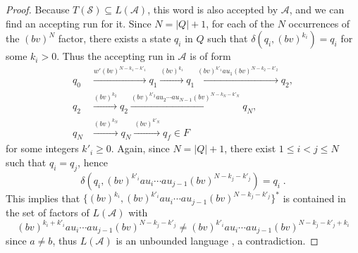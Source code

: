 \documentclass[11pt,reqno,a4paper]{amsart}
\newcommand{\ru}[1]{\xrightarrow{#1}}
\theoremstyle{plain}
\theoremstyle{definition}
\theoremstyle{remark}
\begin{document}
\begin{proof}
  Because $T(\mathcal{S})\subseteq L(\mathcal{A})$, this word is also
  accepted by $\mathcal{A}$, and we can find an accepting run for it.
  Since $N=|Q|+1$, for each of the $N$ occurrences of the $(bv)^N$
  factor, there exists a state $q_i$ in $Q$ such that
  $\delta(q_i,(bv)^{k_i})=q_i$ for some $k_i>0$.  Thus the accepting run
  in $\mathcal{A}$ is of form
  \begin{align*}
  q_0&\ru{w'(bv)^{N-k_1-k'_1}}q_1\ru{(bv)^{k_1}}q_1\ru{(bv)^{k'_1}au_1(bv)^{N-k_2-k'_2}}q_2,\\q_2&\ru{(bv)^{k_2}}q_2\ru{(bv)^{k'_2}au_2\cdots
    au_{N-1}(bv)^{N-k_N-k'_N}}q_N,\\q_N&\ru{(bv)^{k_N}}q_N\ru{(bv)^{k'_N}}q_f\in F
  \end{align*}
  for some integers $k'_i\geq 0$.  Again, since $N=|Q|+1$, there exist
  $1\leq i<j\leq N$ such that $q_i=q_j$, hence 
  \begin{equation*}
    \delta(q_i,(bv)^{k'_i}au_i\cdots au_{j-1}(bv)^{N-k_j-k'_j})=q_i\;.
  \end{equation*}
  This implies that $\{(bv)^{k_i},(bv)^{k'_i}au_i\cdots
  au_{j-1}(bv)^{N-k_j-k'_j}\}^\ast$ is contained in the set of factors of
  $L(\mathcal{A})$ with
  \begin{equation*}
    (bv)^{k_i+k'_i}au_i\cdots au_{j-1}(bv)^{N-k_j-k'_j}\neq
    (bv)^{k'_i}au_i\cdots au_{j-1}(bv)^{N-k_j-k'_j+k_i}
  \end{equation*}
  since $a\neq b$, thus $L(\mathcal{A})$ is an unbounded language
  \citep[\lemmaautorefname~5.3]{bcfl}, a contradiction.
\end{proof}
\end{document}
